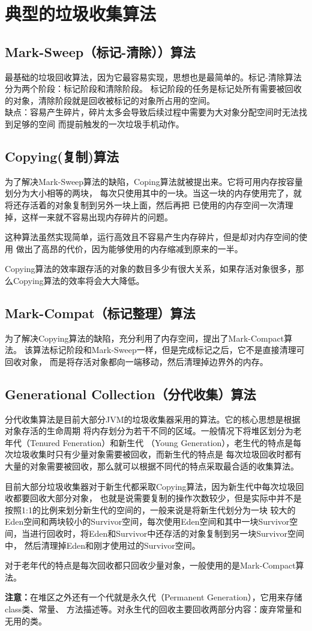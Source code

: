 \section{典型的垃圾收集算法}
\subsection{Mark-Sweep（标记-清除））算法}
最基础的垃圾回收算法，因为它最容易实现，思想也是最简单的。标记-清除算法分为两个阶段：标记阶段和清除阶段。
标记阶段的任务是标记处所有需要被回收的对象，清除阶段就是回收被标记的对象所占用的空间。
\\ 缺点：容易产生碎片，碎片太多会导致后续过程中需要为大对象分配空间时无法找到足够的空间
而提前触发的一次垃圾手机动作。
\subsection{Copying(复制)算法}
为了解决Mark-Sweep算法的缺陷，Coping算法就被提出来。它将可用内存按容量划分为大小相等的两块，
每次只使用其中的一块。当这一块的内存使用完了，就将还存活着的对象复制到另外一块上面，然后再把
已使用的内存空间一次清理掉，这样一来就不容易出现内存碎片的问题。
\par 这种算法虽然实现简单，运行高效且不容易产生内存碎片，但是却对内存空间的使用
做出了高昂的代价，因为能够使用的内存缩减到原来的一半。
\par Copying算法的效率跟存活的对象的数目多少有很大关系，如果存活对象很多，那么Copying算法的效率将会大大降低。
\subsection{Mark-Compat（标记整理）算法}
为了解决Copying算法的缺陷，充分利用了内存空间，提出了Mark-Compact算法。
该算法标记阶段和Mark-Sweep一样，但是完成标记之后，它不是直接清理可回收对象，
而是将存活对象都向一端移动，然后清理掉边界外的内存。
\subsection{Generational Collection（分代收集）算法}
分代收集算法是目前大部分JVM的垃圾收集器采用的算法。它的核心思想是根据对象存活的生命周期
将内存划分为若干不同的区域。一般情况下将堆区划分为老年代（Tenured Feneration）和新生代
（Young Generation），老生代的特点是每次垃圾收集时只有少量对象需要被回收，而新生代的特点是
每次垃圾回收时都有大量的对象需要被回收，那么就可以根据不同代的特点采取最合适的收集算法。
\par 目前大部分垃圾收集器对于新生代都采取Copying算法，因为新生代中每次垃圾回收都要回收大部分对象，
也就是说需要复制的操作次数较少，但是实际中并不是按照1:1的比例来划分新生代的空间的，一般来说是将新生代划分为一块
较大的Eden空间和两块较小的Survivor空间，每次使用Eden空间和其中一块Survivor空间，当进行回收时，将Eden和Survivor中还存活的对象复制到另一块Survivor空间中，
然后清理掉Eden和刚才使用过的Survivor空间。
\par 对于老年代的特点是每次回收都只回收少量对象，一般使用的是Mark-Compact算法。
\par \textbf{注意：}在堆区之外还有一个代就是永久代（Permanent Generation），它用来存储class类、常量、
方法描述等。对永生代的回收主要回收两部分内容：废弃常量和无用的类。

